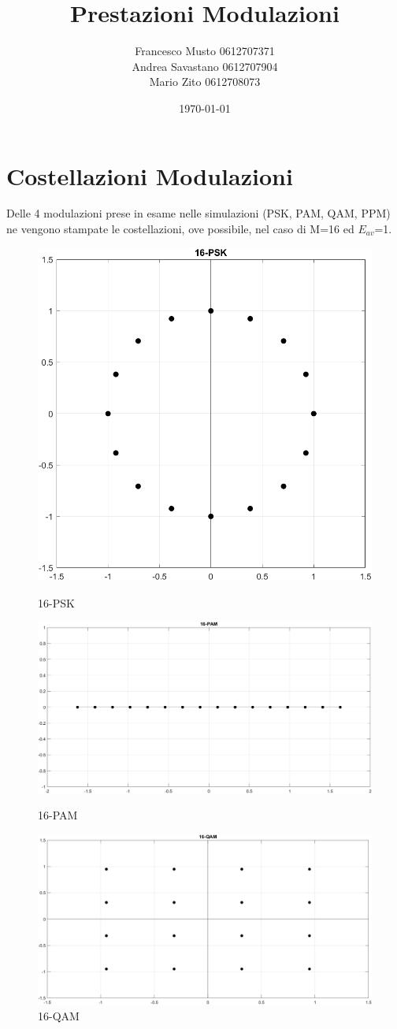 \documentclass[12pt, a4paper]{article}
\title{\Huge Prestazioni Modulazioni}
\author{Francesco Musto 0612707371 \\ Andrea Savastano 0612707904 \\ Mario Zito 0612708073}
\date{\today}
\begin{document}
	\maketitle
	\vspace{-1cm}
	\tableofcontents
	
	
	\newpage
	\section{Costellazioni Modulazioni}
	Delle 4 modulazioni prese in esame nelle simulazioni (PSK, PAM, QAM, PPM) ne vengono stampate le costellazioni, ove possibile, nel caso di M=16 ed \(E_{av}\)=1.
	\begin{figure}[ht]
		\centering
		\includegraphics[width=0.35\linewidth]{images/16-PSK.png}
		\caption{16-PSK}
		\label{fig:psk}
		\begin{minipage}{0.45\linewidth} %
			\centering
			\includegraphics[width=\linewidth]{images/16-PAM.png}
			\caption{16-PAM}
			\label{fig:pam}
		\end{minipage}
		\hspace{0.5cm} %
		\begin{minipage}{0.45\linewidth}
			\centering
			\includegraphics[width=\linewidth]{images/16-QAM.png}
			\caption{16-QAM}
			\label{fig:qam}
		\end{minipage}
	\end{figure}
	
\end{document}

